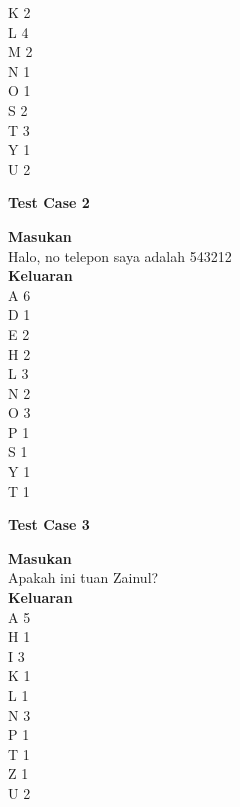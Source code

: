 \begin{pemrograman}
K 2\\
L 4\\
M 2\\
N 1\\
O 1\\
S 2\\
T 3\\
Y 1\\
U 2\\
\begin{center}
\textbf{Test Case 2}\\
\end{center}
\textbf{Masukan}\\
Halo, no telepon saya adalah 543212\\
\textbf{Keluaran}\\
A 6\\
D 1\\
E 2\\
H 2\\
L 3\\
N 2\\
O 3\\
P 1\\
S 1\\
Y 1\\
T 1\\
\begin{center}
\textbf{Test Case 3}\\
\end{center}
\textbf{Masukan}\\
Apakah ini tuan Zainul?\\
\textbf{Keluaran}\\
A 5\\
H 1\\
I 3\\
K 1\\
L 1\\
N 3\\
P 1\\
T 1\\
Z 1\\
U 2\\
\end{pemrograman}
